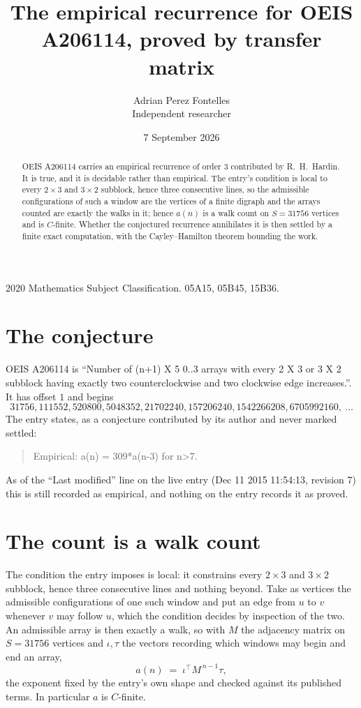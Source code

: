 \documentclass[11pt,a4paper]{article}
\title{The empirical recurrence for OEIS A206114, proved by transfer matrix}
\author{Adrian Perez Fontelles\\ \small Independent researcher}
\date{7 September 2026}
\theoremstyle{plain}
\theoremstyle{definition}
\begin{document}
\maketitle

\begin{abstract}
OEIS A206114 carries an empirical recurrence of order $3$ contributed by R.~H.~Hardin. It is
true, and it is decidable rather than empirical. The entry's condition is local to every $2\times3$ and $3\times2$ subblock, hence three consecutive lines, so
the admissible configurations of such a window are the vertices of a finite digraph and the
arrays counted are exactly the walks in it; hence $a(n)$ is a walk count on $S=31756$ vertices
and is $C$-finite. Whether the conjectured recurrence annihilates it is then settled by a
finite exact computation, with the Cayley--Hamilton theorem bounding the work.
\end{abstract}

\noindent\small 2020 Mathematics Subject Classification. 05A15, 05B45, 15B36.\normalsize

\section{The conjecture}

OEIS A206114 is ``Number of (n+1) X 5 0..3 arrays with every 2 X 3 or 3 X 2 subblock having exactly two counterclockwise and two clockwise edge increases.''. It has offset $1$ and begins
\[
31756, 111552, 520800, 5048352, 21702240, 157206240, 1542266208, 6705992160,\ \dots
\]
The entry states, as a conjecture contributed by its author and never marked settled:
\begin{quote}
Empirical: a(n) = 309*a(n-3) for n>7.
\end{quote}
As of the ``Last modified'' line on the live entry (Dec 11 2015 11:54:13, revision 7) this is still
recorded as empirical, and nothing on the entry records it as proved.

\section{The count is a walk count}

The condition the entry imposes is local: it constrains every $2\times3$ and $3\times2$ subblock, hence three consecutive lines and nothing beyond. Take as
vertices the admissible configurations of one such window and put an edge from $u$ to $v$
whenever $v$ may follow $u$, which the condition decides by inspection of the two. An
admissible array is then exactly a walk, so with $M$ the adjacency matrix on $S=31756$ vertices
and $\iota,\tau$ the vectors recording which windows may begin and end an array,
\[
a(n)\;=\;\iota^{\!\top}M^{\,n-1}\tau ,
\]
the exponent fixed by the entry's own shape and checked against its published terms. In
particular $a$ is $C$-finite.
\end{document}
